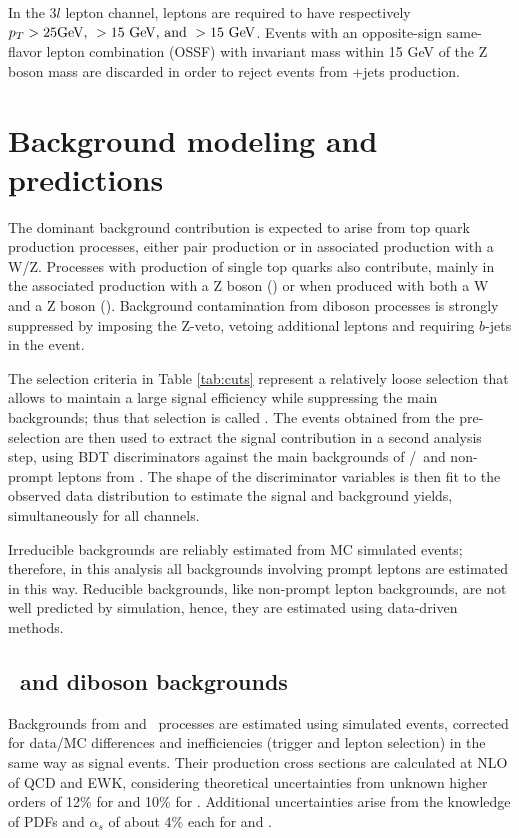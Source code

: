 In the $3l$ lepton channel, leptons are required to have respectively $p_T > 25 \textrm{GeV, }> 15\textrm{ GeV, and }> 15\textrm{ GeV}$. Events with an opposite-sign same-flavor lepton combination (OSSF) with invariant mass within 15 GeV of the Z boson mass are discarded in order to reject events from \WZ +jets production.

\section{Background modeling and predictions}\label{sec:bg}

The dominant background contribution is expected to arise from top quark production processes, either \ttbar pair production or in \ttbar associated production with a W/Z. Processes with production of single top quarks also contribute, mainly in the associated production with a Z boson (\tZq) or when produced with both a W and a Z boson (\tZW). Background contamination from diboson processes is strongly suppressed by imposing the Z-veto, vetoing additional leptons and requiring $b$-jets in the event.

The selection criteria in Table \ref{tab:cuts} represent a relatively loose selection that allows to maintain a large signal efficiency while suppressing the main backgrounds; thus that selection is called . The events obtained from the pre-selection are then used to extract the signal contribution in a second analysis step, using BDT discriminators against the main backgrounds of \ttW/\ttZ\ and non-prompt leptons from \ttbar. The shape of the discriminator variables is then fit to the observed data distribution to estimate the signal and background yields, simultaneously for all channels.

Irreducible backgrounds are reliably estimated from MC simulated events; therefore, in this analysis all backgrounds involving prompt leptons are estimated in this way. Reducible backgrounds, like non-prompt lepton backgrounds, are not well predicted by simulation, hence, they are estimated using data-driven methods.

\subsection{\ttV\ and diboson backgrounds}

Backgrounds from \ttW and \ttZ\ processes are estimated using simulated events, corrected for data/MC differences and inefficiencies (trigger and lepton selection) in the same way as signal events. Their production cross sections are calculated at NLO of QCD and EWK, considering theoretical uncertainties from unknown higher orders of 12\% for \ttW and 10\% for \ttZ. Additional uncertainties arise from the knowledge of PDFs and $\alpha_s$ of about 4\% each for \ttW and \ttZ.

